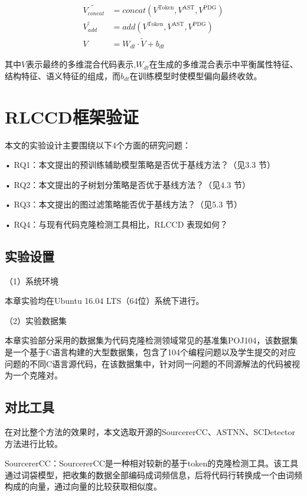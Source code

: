 \begin{equation}\label{e6.1}
  \begin{split}
    \tilde{V_{concat}} &= concat \left( V^{\text{Token}} , V^{\text{AST}} , V^{\text{PDG}}\right) \\
    \tilde{V_{add}} &= add \left( V^{\text{Token}} , V^{\text{AST}} , V^{\text{PDG}}\right) \\
    V &= W_{dt} \cdot \tilde{V} + b_{dt}
  \end{split}
\end{equation}

其中$V$表示最终的多维混合代码表示,$W_{dt}$在生成的多维混合表示中平衡属性特征、结构特征、语义特征的组成，而$b_{dt}$在训练模型时使模型偏向最终收敛。

\section{RLCCD框架验证}
本文的实验设计主要围绕以下4个方面的研究问题：

• RQ1：本文提出的预训练辅助模型策略是否优于基线方法？（见3.3 节）

• RQ2：本文提出的子树划分策略是否优于基线方法？（见4.3 节）

• RQ3：本文提出的图过滤策略能否优于基线方法？（见5.3 节）

• RQ4：与现有代码克隆检测工具相比，RLCCD 表现如何？

\subsection{实验设置}
（1）系统环境

本章实验均在Ubuntu 16.04 LTS（64位）系统下进行。


（2）实验数据集

本章实验部分采用的数据集为代码克隆检测领域常见的基准集POJ104，该数据集是一个基于C语言构建的大型数据集，包含了104个编程问题以及学生提交的对应问题的不同C语言源代码，在该数据集中，针对同一问题的不同源解法的代码被视为一个克隆对。

\subsection{对比工具}
在对比整个方法的效果时，本文选取开源的SourcererCC、ASTNN、SCDetector方法进行比较。

SourcererCC：SourcererCC是一种相对较新的基于token的克隆检测工具。该工具通过词袋模型，把收集的数据全部编码成词频信息，后将代码行转换成一个由词频构成的向量，通过向量的比较获取相似度。

